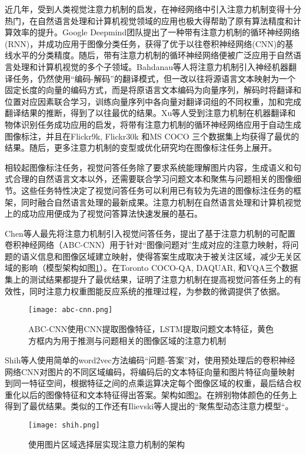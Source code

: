 近几年，受到人类视觉注意力机制的启发，在神经网络中引入注意力机制变得十分热门，在自然语言处理和计算机视觉领域的应用也极大得帮助了原有算法精度和计算效率的提升。Google Deepmind团队提出了一种带有注意力机制的循环神经网络(RNN)，并成功应用于图像分类任务，获得了优于以往卷积神经网络(CNN)的基线水平的分类精度。随后，带有注意力机制的循环神经网络便被广泛应用于自然语言处理和计算机视觉的多个子领域。Bahdanau等人将注意力机制引入神经机器翻译任务，仍然使用“编码-解码”的翻译模式，但一改以往将源语言文本映射为一个固定长度的向量的编码方式，而是将原语言文本编码为向量序列，解码时将翻译和位置对应因素联合学习，训练向量序列中各向量对翻译词组的不同权重，加和完成翻译结果的推断，得到了以往最优的结果。Xu等人受到注意力机制在机器翻译和物体识别任务成功应用的启发，将带有注意力机制的循环神经网络应用于自动生成图像标注，并且在Flickr9k, Flickr30k 和MS COCO 三个数据集上均获得了最优的结果。随后，更多注意力机制的变型或优化研究均在图像标注任务上展开。

相较起图像标注任务，视觉问答任务除了要求系统能理解图片内容，生成语义和句式合理的自然语言文本以外，还需要联合学习问题文本和聚焦与问题相关的图像细节。这些任务特性决定了视觉问答任务可以利用已有较为先进的图像标注任务的框架，同时融合自然语言处理的最新成果。注意力机制在自然语言处理和计算机视觉上的成功应用便成为了视觉问答算法快速发展的基石。

Chen等人最先将注意力机制引入视觉问答任务，提出了基于注意力机制的可配置卷积神经网络（ABC-CNN）用于针对“图像问题对”生成对应的注意力映射，将问题的语义信息和图像区域建立映射，使得答案生成取决于被关注区域，减少无关区域的影响（模型架构如图\ref{abc-cnn}）。在Toronto COCO-QA, DAQUAR, 和VQA三个数据集上的测试结果都提升了最优结果，证明了注意力机制在提高视觉问答任务上的有效性，同时注意力权重图能反应系统的推理过程，为参数的微调提供了依据。
\begin{figure}[H]
	\centering
	\texttt{[image: abc-cnn.png]}
	\caption{ABC-CNN使用CNN提取图像特征，LSTM提取问题文本特征，黄色方框内为用于推测与问题相关的图像区域的注意力机制}
	\label{abc-cnn}
\end{figure}

Shih等人使用简单的word2vec方法编码“问题-答案”对，使用预处理后的卷积神经网络CNN对图片的不同区域编码，将编码后的文本特征向量和图片特征向量映射到同一特征空间，根据特征之间的点乘运算决定每个图像区域的权重，最后结合权重化以后的图像特征和文本特征得出答案。架构如图\ref{shih}。在辨别物体颜色的任务上得到了最优结果。类似的工作还有Ilievski等人提出的“聚焦型动态注意力模型“。
\begin{figure}[H]
	\centering
	\texttt{[image: shih.png]}
	\caption{使用图片区域选择层实现注意力机制的架构}
	\label{shih}
\end{figure}

